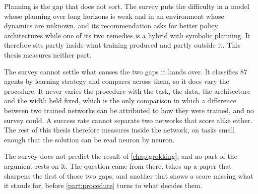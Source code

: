 Planning is the gap that does not sort. The survey puts the difficulty in a model whose planning over
long horizons is weak and in an environment whose dynamics are unknown, and
its recommendation asks for better policy architectures while one of its two
remedies is a hybrid with symbolic planning. It therefore sits partly inside
what training produced and partly outside it. This thesis measures neither
part.

The survey cannot settle what causes the two gaps it hands over. It classifies $87$ agents by learning strategy and compares
across them, so it does vary the procedure. It never varies the procedure with
the task, the data, the architecture and the width held fixed, which is the
only comparison in which a difference between two trained networks can be
attributed to how they were trained, and no survey could. A success rate
cannot separate two networks that score alike either. The rest of this thesis
therefore measures inside the network, on tasks small enough that the solution
can be read neuron by neuron.

The survey does not predict the result of \cref{chap:grokking}, and no part of
the argument rests on it. The question came from there.
 takes up a paper that sharpens the first of those two
gaps, and another that shows a score missing what it stands for, before
\cref{part:procedure} turns to what decides them.

